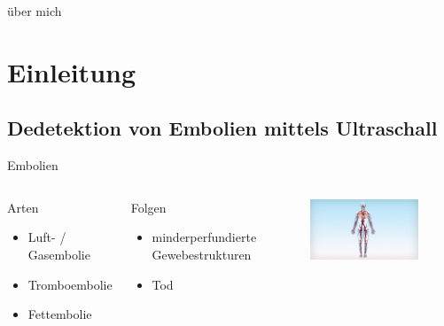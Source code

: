 \documentclass{beamer}
\begin{document}
\begin{frame}{über mich}
\end{frame}
  


\section{Einleitung}
\subsection{Dedetektion von Embolien mittels Ultraschall}
\begin{frame}{Embolien}
	\begin{columns}
		\begin{block}{Arten}
			\begin{itemize}
				\item Luft- / Gasembolie
				\item Tromboembolie
				\item Fettembolie
			\end{itemize}
		\end{block}
		\begin{block}{Folgen}
			\begin{itemize}
				\item minderperfundierte Gewebestrukturen
				\item Tod
			\end{itemize}
		\end{block}
	\centering
		\begin{figure}[t]
			\includegraphics[trim = 24cm 1cm 25cm 1cm, clip=true, width=1\textwidth]{Praesentation/maxresdefault}
		\end{figure}
	\end{columns}
\end{frame}
\end{document}
